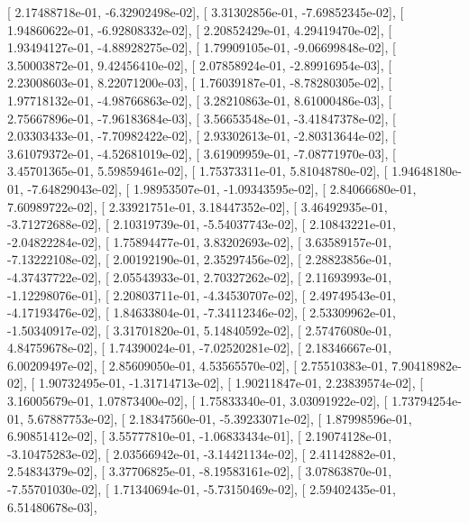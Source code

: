 \documentclass{article}
\begin{document}
       [  2.17488718e-01,  -6.32902498e-02],
       [  3.31302856e-01,  -7.69852345e-02],
       [  1.94860622e-01,  -6.92808332e-02],
       [  2.20852429e-01,   4.29419470e-02],
       [  1.93494127e-01,  -4.88928275e-02],
       [  1.79909105e-01,  -9.06699848e-02],
       [  3.50003872e-01,   9.42456410e-02],
       [  2.07858924e-01,  -2.89916954e-03],
       [  2.23008603e-01,   8.22071200e-03],
       [  1.76039187e-01,  -8.78280305e-02],
       [  1.97718132e-01,  -4.98766863e-02],
       [  3.28210863e-01,   8.61000486e-03],
       [  2.75667896e-01,  -7.96183684e-03],
       [  3.56653548e-01,  -3.41847378e-02],
       [  2.03303433e-01,  -7.70982422e-02],
       [  2.93302613e-01,  -2.80313644e-02],
       [  3.61079372e-01,  -4.52681019e-02],
       [  3.61909959e-01,  -7.08771970e-03],
       [  3.45701365e-01,   5.59859461e-02],
       [  1.75373311e-01,   5.81048780e-02],
       [  1.94648180e-01,  -7.64829043e-02],
       [  1.98953507e-01,  -1.09343595e-02],
       [  2.84066680e-01,   7.60989722e-02],
       [  2.33921751e-01,   3.18447352e-02],
       [  3.46492935e-01,  -3.71272688e-02],
       [  2.10319739e-01,  -5.54037743e-02],
       [  2.10843221e-01,  -2.04822284e-02],
       [  1.75894477e-01,   3.83202693e-02],
       [  3.63589157e-01,  -7.13222108e-02],
       [  2.00192190e-01,   2.35297456e-02],
       [  2.28823856e-01,  -4.37437722e-02],
       [  2.05543933e-01,   2.70327262e-02],
       [  2.11693993e-01,  -1.12298076e-01],
       [  2.20803711e-01,  -4.34530707e-02],
       [  2.49749543e-01,  -4.17193476e-02],
       [  1.84633804e-01,  -7.34112346e-02],
       [  2.53309962e-01,  -1.50340917e-02],
       [  3.31701820e-01,   5.14840592e-02],
       [  2.57476080e-01,   4.84759678e-02],
       [  1.74390024e-01,  -7.02520281e-02],
       [  2.18346667e-01,   6.00209497e-02],
       [  2.85609050e-01,   4.53565570e-02],
       [  2.75510383e-01,   7.90418982e-02],
       [  1.90732495e-01,  -1.31714713e-02],
       [  1.90211847e-01,   2.23839574e-02],
       [  3.16005679e-01,   1.07873400e-02],
       [  1.75833340e-01,   3.03091922e-02],
       [  1.73794254e-01,   5.67887753e-02],
       [  2.18347560e-01,  -5.39233071e-02],
       [  1.87998596e-01,   6.90851412e-02],
       [  3.55777810e-01,  -1.06833434e-01],
       [  2.19074128e-01,  -3.10475283e-02],
       [  2.03566942e-01,  -3.14421134e-02],
       [  2.41142882e-01,   2.54834379e-02],
       [  3.37706825e-01,  -8.19583161e-02],
       [  3.07863870e-01,  -7.55701030e-02],
       [  1.71340694e-01,  -5.73150469e-02],
       [  2.59402435e-01,   6.51480678e-03],
\end{document}
